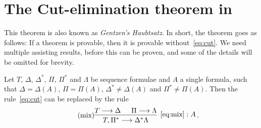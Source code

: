 \documentclass[11pt,a4paper]{article}
\begin{document}
\section{The Cut-elimination theorem in \LK}

This theorem is also known as \emph{Gentzen's Haubtsatz}.
In short, the theorem goes as follows: If a theorem is provable,
then it is provable without~\eqref{eq:cut}.
We need multiple assisting results,
before this can be proven,
and some of the details will be omitted for brevity.

\begin{lemma}\label{lem:mix rule}
    Let \(T\), \(\Delta\), \(\Delta^\ast\), \(\Pi\), \(\Pi^\ast\) and \(\Lambda\) be sequence formulae
    and \(A\) a single formula, such that \(\Delta = \Delta(A)\), \(\Pi = \Pi(A)\),
    \(\Delta^\ast\neq\Delta(A)\) and \(\Pi^\ast\neq\Pi(A)\). Then the rule~\eqref{eq:cut}
    can be replaced by the rule
    \begin{equation}\label{eq:mix}\tag{mix}
        \begin{prooftree}
            \hypo{T\seq\Delta}
            \hypo{\Pi\seq\Lambda}
            \infer2[\(\eqref{eq:mix}:A\)]{T,\Pi^\ast\seq\Delta^\ast\Lambda}
        \end{prooftree}\,.
    \end{equation}
\end{lemma}
\end{document}
